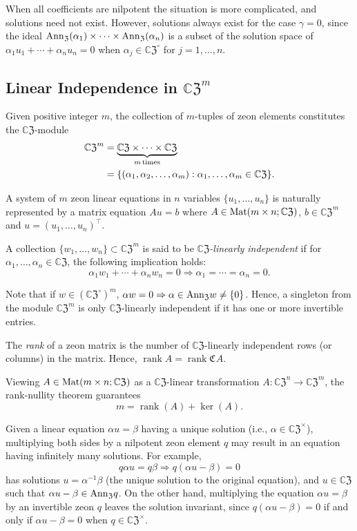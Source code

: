 \documentclass{article}
\theoremstyle{definition}
\newcommand{\zco}{\mathfrak{C}\mspace{1mu}}
\newcommand{\CZ}{\mathbb{C}\mathfrak{Z}}
\newcommand{\Mat}{{\rm Mat}}
\newcommand{\Z}{\mathfrak{Z}}
\newcommand{\Ann}{{\rm Ann}_\Z}
\DeclareMathOperator{\rnk}{rank}
\numberwithin{equation}{section}
\begin{document}
When all coefficients are nilpotent the situation is more complicated, and solutions need not exist. However, solutions always exist for the case $\gamma=0$, since the ideal $\Ann(\alpha_1)\times\cdots\times \Ann(\alpha_n)$ is a subset of the solution space of $\alpha_1 u_1+\cdots+\alpha_n u_n=0$ when $\alpha_j\in\CZ^\circ$ for $j=1, \ldots, n$.    





\subsection{Linear Independence in $\CZ^m$}

Given positive integer $m$, the collection of $m$-tuples of zeon elements constitutes the $\CZ$-module
\begin{align*}
{\CZ}^m&=\underset{m\, \text{\rm times}}{\underbrace{\CZ\times \cdots \times \CZ}}\\
&=\{(\alpha_1, \alpha_2, \ldots, \alpha_m): \alpha_1, \ldots, \alpha_m\in \CZ\}.  
\end{align*}

A system of $m$ zeon linear equations in $n$ variables $\{u_1, \ldots, u_n\}$ is naturally represented by a matrix equation $Au=b$ where $A\in\Mat(m\times n;\CZ)$, $b\in\CZ^m$ and $u=(u_1, \ldots, u_n)^\intercal$.  


A collection $\{w_1, \ldots, w_n\}\subset\CZ^m$ is said to be {\em $\CZ$-linearly independent} if for $\alpha_1, \ldots, \alpha_n\in\CZ$, the following implication holds:
\begin{equation*}
\alpha_1 w_1+\cdots + \alpha_n w_n=0 \Rightarrow \alpha_1=\cdots=\alpha_n =0.
\end{equation*}

Note that if $w\in (\CZ^\circ)^m$, $\alpha w=0\Rightarrow \alpha\in\Ann w\ne \{0\}$.  Hence, a singleton from the module $\CZ^m$ is only $\CZ$-linearly independent if it has one or more invertible entries.  

The {\em rank} of a zeon matrix is the number of $\CZ$-linearly independent rows (or columns) in the matrix.  Hence, $\rnk A=\rnk\zco A$.  

Viewing $A\in\Mat(m\times n;\CZ)$ as a $\CZ$-linear transformation $A:\CZ^n\to\CZ^m$, the rank-nullity theorem guarantees 
\begin{equation}
m=\rnk(A)+\ker(A).
\end{equation}


Given a linear equation $\alpha u=\beta$ having a unique solution (i.e., $\alpha\in\CZ^\times$),  multiplying both sides by a nilpotent zeon element $q$ may result in an equation  having infinitely many solutions.  For example, \begin{equation*}
q\alpha u=q\beta\Rightarrow q(\alpha u-\beta)=0
\end{equation*}
has solutions $u=\alpha^{-1}\beta$ (the unique solution to the original equation), and $u\in\CZ$ such that $\alpha u-\beta\in\Ann q$.
On the other hand, multiplying the equation $\alpha u=\beta$ by an invertible zeon $q$ leaves the solution invariant, since $q(\alpha u-\beta)=0$ if and only if $\alpha u-\beta=0$ when $q\in\CZ^\times$.
\end{document}
